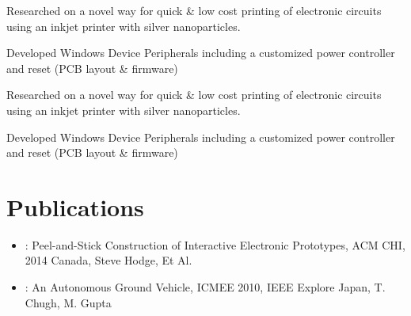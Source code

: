 \documentclass[]{resume-openfont}
\begin{document}
\begin{minipage}[t]{0.63\textwidth}
\begin{tightemize}
\item  Researched on a novel way for quick \& low cost printing of electronic circuits using an inkjet printer with silver nanoparticles.
\item Developed Windows Device Peripherals including a customized power controller and reset (PCB layout \& firmware) 
\end{tightemize}
\sectionsep

\begin{tightemize}
\item  Researched on a novel way for quick \& low cost printing of electronic circuits using an inkjet printer with silver nanoparticles.
\item Developed Windows Device Peripherals including a customized power controller and reset (PCB layout \& firmware) 
\end{tightemize}
\sectionsep


\section{Publications}
\begin{itemize}
\item \href{http://research.microsoft.com/pubs/207114/2014-02-14\%20CHI\%20sticker\%20circuits.pdf}{}: Peel-and-Stick Construction of Interactive Electronic Prototypes, ACM CHI, 2014 Canada, Steve Hodge, Et Al.
\item \href{http://ieeexplore.ieee.org/xpl/login.jsp?tp=&arnumber=5558532&url=http\%3A\%2F\%2Fieeexplore.ieee.org\%2Fxpls\%2Fabs_all.jsp\%3Farnumber\%3D5558532}{}: An Autonomous Ground Vehicle, ICMEE 2010, IEEE Explore Japan, T. Chugh, M. Gupta

\end{itemize}



\end{minipage}
\end{document}
